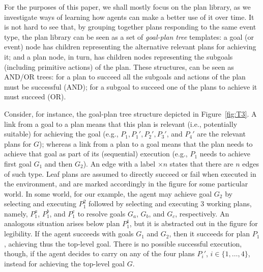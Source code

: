 For the purposes of this paper, we shall mostly focus on the plan library, as we investigate ways of
learning how agents can make a better use of it over time.
%
It is not hard to see that, by grouping together plans responding to the same event type, the
plan library can be seen as a set of \emph{goal-plan tree} templates: a goal (or event) node has
children representing the alternative relevant plans for achieving it; and a plan node,
in turn, has children nodes representing the subgoals (including primitive actions) of the plan. 
%
These structures, can be seen as AND/OR trees: for a plan to succeed all the subgoals and
actions of the plan must be successful (AND); for a subgoal to succeed one of the plans to
achieve it must succeed (OR).

Consider, for instance, the goal-plan tree structure depicted in Figure~\ref{fig:T3}.
%
A link from a goal to a plan means that this plan is relevant (i.e., potentially suitable)
for achieving the goal (e.g., $P_1,P_1',P_2',P_3'$, and $P_4'$ are the relevant plans for
$G$); whereas a link from a plan to a goal means that the plan needs to achieve that goal as part of
its (sequential) execution (e.g., $P_1$ needs to achieve first goal $G_1$ and then $G_2$). 
%
An edge with a label $\times n$ states that there are $n$ edges of such type. 
%
Leaf plans are assumed to directly succeed or fail when executed in the environment, and are
marked accordingly in the figure for some particular world.
%
In some world, for our example, the agent may achieve goal $G_2$ by
selecting and executing $P_1^2$ followed by selecting and executing $3$
working plans, namely, $P_1^a$, $P_1^b$, and $P_1^c$ to resolve goals $G_a$, $G_b$, and $G_c$,
respectively. An analogous situation arises below plan $P_1^1$, but it is abstracted out in
the figure for legibility. If the agent succeeds with goals $G_1$ and
$G_2$, then it succeeds for plan
$P_1$, achieving thus the top-level goal. There is no possible successful execution, though, if the
agent decides to carry on any of the four plans $P_i'$, $i \in \{1,\ldots,4\}$, instead for
achieving the top-level goal $G$.


